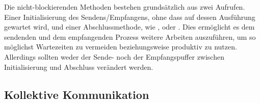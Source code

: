     Die nicht-blockierenden Methoden bestehen grundsätzlich aus zwei Aufrufen. Einer Initialisierung des Sendens/Empfangens, ohne dass auf dessen Ausführung gewartet wird, und
    einer Abschlussmethode, wie ,  oder . Dies ermöglicht es dem sendenden und dem empfangenden Prozess weitere Arbeiten auszuführen,
    um so möglichst Wartezeiten zu vermeiden beziehungsweise produktiv zu nutzen. Allerdings sollten weder der Sende- noch der Empfangspuffer zwischen Initialisierung und Abschluss
    verändert werden. \citep{mpi_p2p, mpiv31}
    
      
    \subsection{Kollektive Kommunikation}
    \label{sec:kolkom}
    
